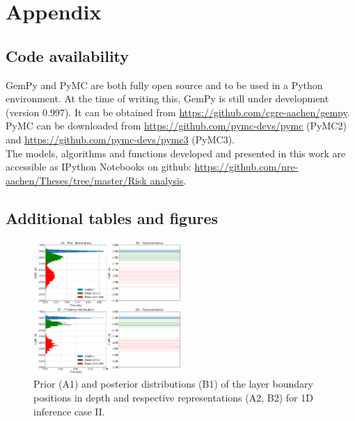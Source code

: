 \documentclass[a4paper,11pt]{MScThesis}
\begin{document}
\cleardoublepage
		
		
		
		




%
    


\appendix

    \chapter{Appendix}
    \section{Code availability}
    	GemPy and PyMC are both fully open source and to be used in a Python environment. At the time of writing this, GemPy is still under development (version 0.997). It can be obtained from \url{https://github.com/cgre-aachen/gempy}. PyMC can be downloaded from \url{https://github.com/pymc-devs/pymc} (PyMC2) and \url{https://github.com/pymc-devs/pymc3} (PyMC3).\\
    	The models, algorithms and functions developed and presented in this work are accessible as IPython Notebooks on github: \url{https://github.com/nre-aachen/Theses/tree/master/Risk analysis}.
\newpage
    \section{Additional tables and figures}
    
    \begin{figure}[h]
    	\centering
    	\includegraphics[width=0.50\textwidth]{Figures/Appendix/update_goodseal1}
    	\caption{Prior (A1) and posterior distributions (B1) of the layer boundary positions in depth and respective representations (A2, B2) for 1D inference case II.}\label{fig:update_goodseal1}
    \end{figure}
\end{document}
